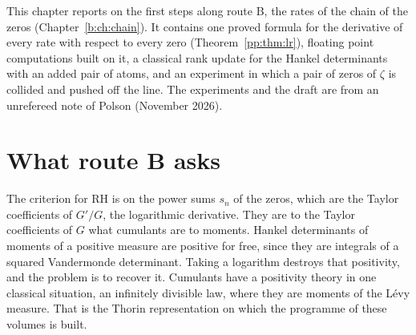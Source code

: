 \label{ch:progress}

This chapter reports on the first steps along route B, the rates of the chain of the zeros (Chapter~\ref{b:ch:chain}). It contains one proved formula for the derivative of every rate with respect to every zero (Theorem~\ref{pp:thm:lr}), floating point computations built on it, a classical rank update for the Hankel determinants with an added pair of atoms, and an experiment in which a pair of zeros of $\zeta$ is collided and pushed off the line. The experiments and the draft are from an unrefereed note of Polson (November 2026).

\section{What route B asks}\label{pp:sec:intro}

The criterion for RH is on the power sums $s_n$ of the zeros, which are the Taylor coefficients of $G'/G$, the logarithmic derivative. They are to the Taylor coefficients of $G$ what cumulants are to moments. Hankel determinants of moments of a positive measure are positive for free, since they are integrals of a squared Vandermonde determinant. Taking a logarithm destroys that positivity, and the problem is to recover it. Cumulants have a positivity theory in one classical situation, an infinitely divisible law, where they are moments of the L\'evy measure. That is the Thorin representation on which the programme of these volumes is built.

